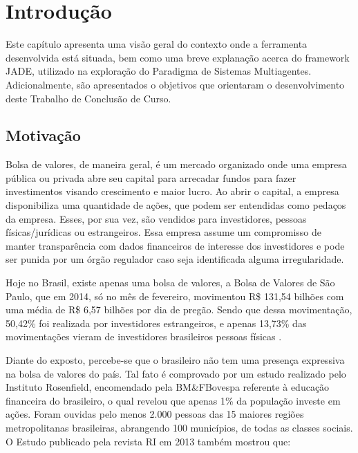 \chapter[INTRODUÇÃO]{Introdução}

Este capítulo apresenta uma visão geral do contexto onde a ferramenta desenvolvida está situada, bem como uma breve explanação acerca do framework JADE, utilizado na exploração do Paradigma de Sistemas Multiagentes. Adicionalmente, são apresentados o objetivos que orientaram o desenvolvimento deste Trabalho de Conclusão de Curso.

\section{Motivação}


Bolsa de valores, de maneira geral, é um mercado organizado onde uma empresa pública ou privada abre seu capital para arrecadar fundos para fazer investimentos visando crescimento e maior lucro. Ao abrir o capital, a empresa disponibiliza uma quantidade de ações, que podem ser entendidas como pedaços da empresa. Esses, por sua vez, são vendidos para investidores, pessoas físicas/jurídicas ou estrangeiros. Essa empresa assume um compromisso de manter transparência com dados financeiros de interesse dos investidores e pode ser punida por um órgão regulador caso seja identificada alguma irregularidade.

Hoje no Brasil, existe apenas uma bolsa de valores, a Bolsa de Valores de São Paulo, que em 2014, só no mês de fevereiro, movimentou R\$ 131,54 bilhões com uma média de R\$ 6,57 bilhões por dia de pregão. Sendo que dessa movimentação, 50,42\% foi realizada por investidores estrangeiros, e apenas 13,73\% das movimentações vieram de investidores brasileiros pessoas físicas \cite{bovespa2014}.

Diante do exposto, percebe-se que o brasileiro não tem uma presença expressiva na bolsa de valores do país. Tal fato é comprovado por um estudo realizado pelo Instituto Rosenfield, encomendado pela BM\&FBovespa referente à educação financeira do brasileiro, o qual revelou que apenas 1\% da população investe em ações. Foram ouvidas pelo menos 2.000 pessoas das 15 maiores regiões metropolitanas brasileiras, abrangendo 100 municípios, de todas as classes sociais\cite{isabella2013}. O Estudo  publicado pela revista RI em 2013 também mostrou que:

